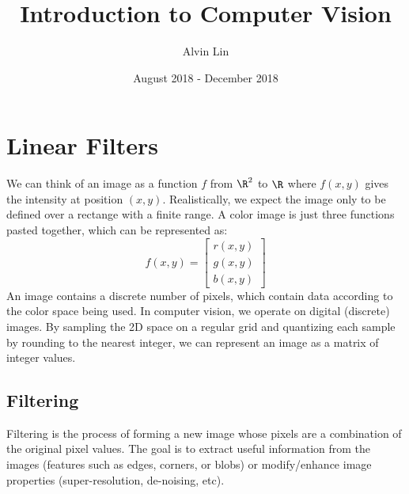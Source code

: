 \documentclass{math}
\title{Introduction to Computer Vision}
\author{Alvin Lin}
\date{August 2018 - December 2018}
\begin{document}
\maketitle

\section*{Linear Filters}
We can think of an image as a function \( f \) from \( \R^2 \) to \( \R \) where
\( f(x,y) \) gives the intensity at position \( (x,y) \). Realistically, we
expect the image only to be defined over a rectange with a finite range. A color
image is just three functions pasted together, which can be represented as:
\[ f(x,y) = \begin{bmatrix}r(x,y) \\ g(x,y) \\ b(x,y)\end{bmatrix} \]
An image contains a discrete number of pixels, which contain data according to
the color space being used. In computer vision, we operate on digital (discrete)
images. By sampling the 2D space on a regular grid and quantizing each sample
by rounding to the nearest integer, we can represent an image as a matrix of
integer values.

\subsection*{Filtering}
Filtering is the process of forming a new image whose pixels are a combination
of the original pixel values. The goal is to extract useful information from
the images (features such as edges, corners, or blobs) or modify/enhance image
properties (super-resolution, de-noising, etc).
\end{document}
